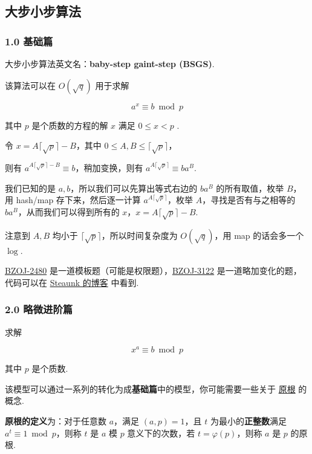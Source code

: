 
\subsection{大步小步算法}

\subsubsection{1.0 基础篇}

大步小步算法英文名：\textbf{baby-step gaint-step (BSGS)}.

该算法可以在 $O(\sqrt{q})$ 用于求解

$$
a^x \equiv b \bmod p
$$

其中 $p$ 是个质数的方程的解 $x$ 满足 $0 \le x < p$ .

令 $x = A \lceil \sqrt p \rceil - B$，其中 $0\le A,B \le \lceil \sqrt p \rceil$，

则有 $a^{A\lceil \sqrt p \rceil -B} \equiv b$，稍加变换，则有 $a^{A\lceil \sqrt p \rceil} \equiv ba^B$.

我们已知的是 $a,b$，所以我们可以先算出等式右边的 $ba^B$ 的所有取值，枚举 $B$，用 hash/map 存下来，然后逐一计算 $a^{A\lceil \sqrt p \rceil}$，枚举 $A$，寻找是否有与之相等的 $ba^B$，从而我们可以得到所有的 $x$，$x=A \lceil \sqrt p \rceil - B$.

注意到 $A,B$ 均小于 $\lceil \sqrt p \rceil$，所以时间复杂度为 $O(\sqrt q)$，用 map 的话会多一个 $\log$.

\href{http://www.lydsy.com/JudgeOnline/problem.php?id=2480}{BZOJ-2480} 是一道模板题（可能是权限题），\href{http://www.lydsy.com/JudgeOnline/problem.php?id=3122}{BZOJ-3122} 是一道略加变化的题，代码可以在 \href{https://blog.csdn.net/Steaunk/article/details/78988376}{Steaunk 的博客} 中看到.

\subsubsection{2.0 略微进阶篇}

求解

$$
x^a \equiv b \bmod p
$$

其中 $p$ 是个质数.

该模型可以通过一系列的转化为成\textbf{基础篇}中的模型，你可能需要一些关于 \href{/math/primitive-root/}{原根} 的概念.

\textbf{原根的定义}为：对于任意数 $a$，满足 $(a,p)=1$，且 $t$ 为最小的\textbf{正整数}满足 $a^t \equiv 1 \bmod p$，则称 $t$ 是 $a$ 模 $p$ 意义下的次数，若 $t=\varphi(p)$，则称 $a$ 是 $p$ 的原根.


